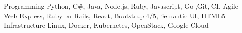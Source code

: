 \begin{cvskills}
  \cvskill
    {Programming}
    {Python, C\#, Java, Node.js, Ruby, Javascript, Go ,Git, CI, Agile}
  \cvskill
    {Web}
    {Express, Ruby on Rails, React, Bootstrap 4/5, Semantic UI, HTML5}
  \cvskill
    {Infrastructure}
    {Linux, Docker, Kubernetes, OpenStack, Google Cloud}
\end{cvskills}
